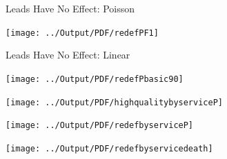 \documentclass[12pt] {article}
\begin{document}

\pagebreak{}
\clearpage{}
\begin{table}
\caption{}
\label{Flo:Rdeathslinear}
\scalebox{0.9}{

}
\end{table}




\pagebreak{}
\clearpage{}
\begin{table}
\caption{Leads Have No Effect: Poisson}
\label{Flo:redefPF1}
\texttt{[image: ../Output/PDF/redefPF1]}
\end{table}

\pagebreak{}
\clearpage{}
\begin{table}
\caption{Leads Have No Effect: Linear}
\label{Flo:forwardbasicLN}

\end{table}

\pagebreak{}
\clearpage{}
\begin{table}
\caption{}
\label{Flo:alldeaths90}
\texttt{[image: ../Output/PDF/redefPbasic90]}
\end{table}

\pagebreak{}
\clearpage{}
\begin{table}
\caption{}
\label{Flo:Recruits by Service}\texttt{[image: ../Output/PDF/highqualitybyserviceP]}
\end{table}

\pagebreak{}
\clearpage{}
\begin{table}
\caption{}
\label{Flo:Death by Same-Service Other-Service}\texttt{[image: ../Output/PDF/redefbyserviceP]}
\end{table}

\clearpage{}
\pagebreak{}
\begin{table}
\caption{}
\label{Flo: Death by Service}\texttt{[image: ../Output/PDF/redefbyservicedeath]}
\end{table}
\end{document}
